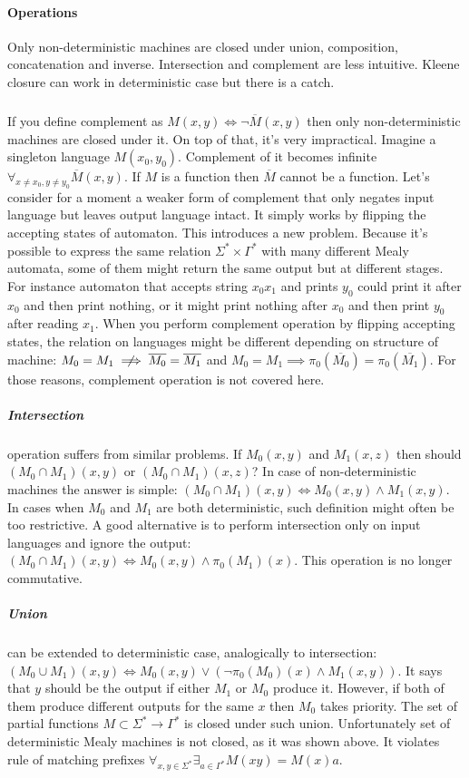 \documentclass[12pt]{article}
\begin{document}
\paragraph{Operations} Only non-deterministic machines are closed under union, composition, concatenation and inverse. Intersection and complement are less intuitive. Kleene closure can work in deterministic case but there is a catch.
\subparagraph{} If you define complement as $M(x,y) \iff \neg \overline{M}(x,y)$ then only non-deterministic machines are closed under it. On top of that, it's very impractical. Imagine a singleton language $M(x_0,y_0)$. Complement of it becomes infinite $\forall_{x\ne x_0,y\ne y_0} \overline{M}(x,y)$. If $M$ is a function then $\overline{M} $ cannot be a function. Let's consider for a moment a weaker form of complement that only negates input language but leaves output language intact. It simply works by flipping the accepting states of automaton. This introduces a new problem. Because it's possible to express the same relation $\Sigma^* \times \Gamma^*$ with many different Mealy automata, some of them might return the same output but at different stages. For instance automaton that accepts string $x_0x_1$ and prints $y_0$ could print it after $x_0$ and then print nothing, or it might print nothing after $x_0$ and then print $y_0$ after reading $x_1$. When you perform complement operation by flipping accepting states, the relation on languages might be different depending on structure of machine: $M_0 = M_1 \centernot \implies \overline{M_0} = \overline{M_1}$ and $M_0 = M_1  \implies \pi_0(\overline{M_0}) = \pi_0(\overline{M_1})$. For those reasons, complement operation is not covered here.

\subparagraph{Intersection}  operation suffers from similar problems. If $M_0(x,y)$ and $M_1(x,z)$ then should $(M_0 \cap M_1)(x,y)$ or $(M_0 \cap M_1)(x,z)$? In case of non-deterministic machines the answer is simple: $(M_0 \cap M_1)(x,y) \iff M_0(x,y) \wedge M_1(x,y)$. In cases when $M_0$ and $M_1$ are both deterministic, such definition might often be too restrictive. A good alternative is to perform intersection only on input languages and ignore the output: $(M_0 \cap M_1)(x,y) \iff M_0(x,y) \wedge \pi_0(M_1)(x)$. This operation is no longer commutative. 

\subparagraph{Union}  can be extended to deterministic case, analogically to intersection: $(M_0 \cup M_1)(x,y) \iff M_0(x,y) \vee (\neg \pi_0(M_0)(x) \wedge M_1(x,y))$. It says that $y$ should be the output if either $M_1$ or $M_0$ produce it. However, if both of them produce different outputs for the same $x$ then $M_0$ takes priority. The set of partial functions $M \subset \Sigma^* \rightarrow \Gamma^*$ is closed  under such union. Unfortunately set of deterministic Mealy machines is not closed, as it was shown above. It violates rule of matching prefixes $\forall_{x,y\in \Sigma^*} \exists_{a \in \Gamma^* } M(xy)=M(x)a$.
\end{document}
